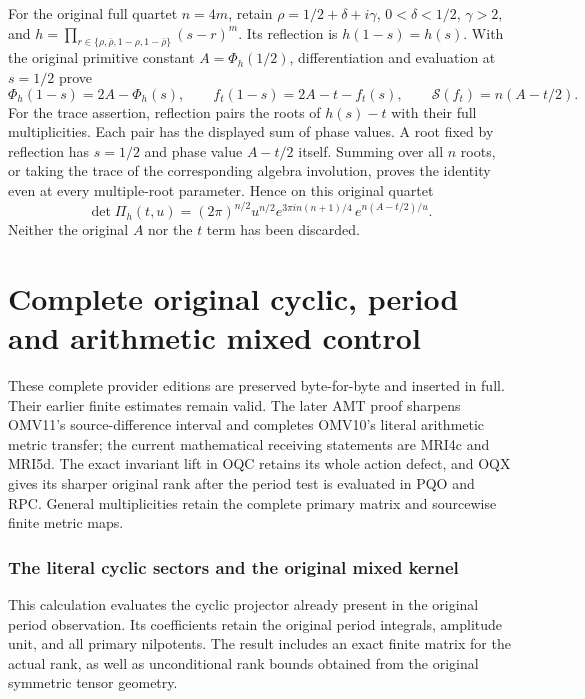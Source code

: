 \documentclass[11pt,a4paper]{article}
\begin{document}
For the original full quartet $n=4m$, retain
$\rho=1/2+\delta+i\gamma$, $0<\delta<1/2$, $\gamma>2$, and
$h=\prod_{r\in\{\rho,\bar\rho,1-\rho,1-\bar\rho\}}(s-r)^m$.
Its reflection is $h(1-s)=h(s)$. With the original primitive constant
$A=\Phi_h(1/2)$, differentiation and evaluation at $s=1/2$ prove
\[
 \Phi_h(1-s)=2A-\Phi_h(s),\qquad
 f_t(1-s)=2A-t-f_t(s),\qquad
 \mathcal S(f_t)=n(A-t/2).
 \tag{PDE12}
\]
For the trace assertion, reflection pairs the roots of $h(s)-t$ with
their full multiplicities. Each pair has the displayed sum of phase
values. A root fixed by reflection has $s=1/2$ and phase value
$A-t/2$ itself. Summing over all $n$ roots, or taking the trace of the
corresponding algebra involution, proves the identity even at every
multiple-root parameter. Hence on this original quartet
\[
 \det\Pi_h(t,u)
  =(2\pi)^{n/2}u^{n/2}
       e^{3\pi i n(n+1)/4}\,e^{n(A-t/2)/u}.
 \tag{PDE13}
\]
Neither the original $A$ nor the $t$ term has been discarded.





\clearpage
\part*{Complete original cyclic, period and arithmetic mixed control}
These complete provider editions are preserved byte-for-byte and
inserted in full. Their earlier finite estimates remain valid.
The later AMT proof sharpens OMV11's source-difference interval
and completes OMV10's literal arithmetic metric transfer; the
current mathematical receiving statements are MRI4c and MRI5d.
The exact invariant lift in OQC retains its whole action defect,
and OQX gives its sharper original rank after the period test
is evaluated in PQO and RPC. General multiplicities retain
the complete primary matrix and sourcewise finite metric maps.

\section{The literal cyclic sectors and the original mixed kernel}
\label{sec:OCS}

This calculation evaluates the cyclic projector already present in
the original period observation. Its coefficients retain the original
period integrals, amplitude unit, and all primary nilpotents. The
result includes an exact finite matrix for the actual rank, as well
as unconditional rank bounds obtained from the original symmetric
tensor geometry.
\end{document}

